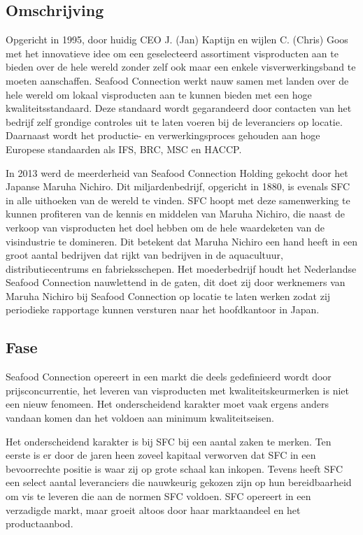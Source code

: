 \documentclass[10pt,a4paper,oneside]{report}
\begin{document}
\subsection{Omschrijving}
Opgericht in 1995, door huidig CEO J. (Jan) Kaptijn en wijlen C. (Chris) Goos met het innovatieve idee om een geselecteerd assortiment visproducten aan te bieden over de hele wereld zonder zelf ook maar een enkele visverwerkingsband te moeten aanschaffen. Seafood Connection werkt nauw samen met landen over de hele wereld om lokaal visproducten aan te kunnen bieden met een hoge kwaliteitsstandaard. Deze standaard wordt gegarandeerd door contacten van het bedrijf zelf grondige controles uit te laten voeren bij de leveranciers op locatie. Daarnaast wordt het productie- en verwerkingsproces gehouden aan hoge Europese standaarden als IFS, BRC, MSC en HACCP. \citep{sfcwebsite}

In 2013 werd de meerderheid van Seafood Connection Holding gekocht door het Japanse Maruha Nichiro. Dit miljardenbedrijf, opgericht in 1880, is evenals SFC in alle uithoeken van de wereld te vinden. SFC hoopt met deze samenwerking te kunnen profiteren van de kennis en middelen van Maruha Nichiro, die naast de verkoop van visproducten het doel hebben om de hele waardeketen van de visindustrie te domineren. Dit betekent dat Maruha Nichiro een hand heeft in een groot aantal bedrijven dat rijkt van bedrijven in de aquacultuur, distributiecentrums en fabrieksschepen. Het moederbedrijf houdt het Nederlandse Seafood Connection nauwlettend in de gaten, dit doet zij door werknemers van Maruha Nichiro bij Seafood Connection op locatie te laten werken zodat zij periodieke rapportage kunnen versturen naar het hoofdkantoor in Japan. \citep{sfcwebsite,Visserijnieuws}

\subsection{Fase}
Seafood Connection opereert in een markt die deels gedefinieerd wordt door prijsconcurrentie, het leveren van visproducten met kwaliteitskeurmerken is niet een nieuw fenomeen. Het onderscheidend karakter moet vaak ergens anders vandaan komen dan het voldoen aan minimum kwaliteitseisen. 

Het onderscheidend karakter is bij SFC bij een aantal zaken te merken. Ten eerste is er door de jaren heen zoveel kapitaal verworven dat SFC in een bevoorrechte positie is waar zij op grote schaal kan inkopen. Tevens heeft SFC een select aantal leveranciers die nauwkeurig gekozen zijn op hun bereidbaarheid om vis te leveren die aan de normen SFC voldoen. SFC opereert in een verzadigde markt, maar groeit altoos door haar marktaandeel en het productaanbod.
\end{document}
